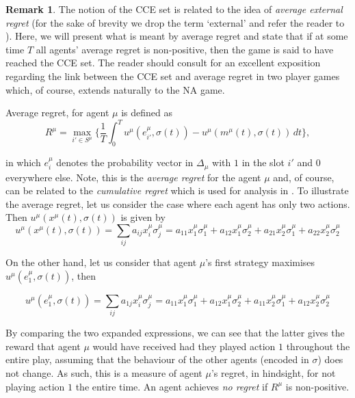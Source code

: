 \documentclass{article}
\theoremstyle{definition}
\newtheorem*{remark}{Remark}
\newcommand{\pure}[2]{e^{#1}_{#2}}
\begin{document}
  \begin{remark} \label{rem::regretvsCCE}
    The notion of the CCE set is related to the idea of \emph{average external regret} (for the
    sake of brevity we drop the term `external' and refer the reader to \cite{Nisan2007}). Here, we
    will present what is meant by average regret and state that if at some time $T$ all agents'
    average regret is non-positive, then the game is said to have reached the CCE set. The
    reader should consult \cite{Ostrovski2014} for an excellent exposition regarding the
    link between the CCE set and average regret in two player games which, of course, extends
    naturally to the NA game.
    
    Average regret, for agent $\mu$ is defined as
%
    \begin{equation}
      R^{\mu} = \max_{i' \in S^\mu} \Big\{ \frac{1}{T} \int_{0}^{T} u^{\mu}(\pure{\mu}{i'}, \sigma(t)) - u^{\mu}(m^\mu(t), \sigma(t)) \, dt \Big\},
    \end{equation}
  
    in which $\pure{\mu}{i}$ denotes the probability vector in $\Delta_\mu$ with $1$ in the slot
    $i'$ and $0$ everywhere else. Note, this is the \emph{average regret} for the agent $\mu$
    and, of course, can be related to the \emph{cumulative regret} which is used for analysis
    in \cite{Leonardos2020, Cesa-Bianchi2021}.  To illustrate the average regret, let us
    consider the case where each agent has only two actions. Then $u^{\mu}(x^\mu(t), \sigma(t))$
    is given by
%    
    \begin{equation}
      u^{\mu}(x^\mu(t), \sigma(t)) = \sum_{ij} a_{ij} x_i^\mu \sigma_j^\mu = a_{11} x_1^\mu \sigma_1^\mu + a_{12} x_1^\mu \sigma_2^\mu + a_{21} x_2^\mu \sigma_1^\mu + a_{22} x_2^\mu \sigma_2^\mu
    \end{equation}
  
    On the other hand, let us consider that agent $\mu$'s first strategy maximises $u^{\mu}(\pure{\mu}{1}, \sigma(t))$, then
  
    \begin{equation}
      u^{\mu}(\pure{\mu}{1}, \sigma(t)) = \sum_{ij} a_{1j} x_i^\mu \sigma_j^\mu = a_{11} x_1^\mu \sigma_1^\mu + a_{12} x_1^\mu \sigma_2^\mu + a_{11} x_2^\mu \sigma_1^\mu + a_{12} x_2^\mu \sigma_2^\mu 
    \end{equation}
  
    By comparing the two expanded expressions, we can see that the latter gives the reward that agent $\mu$ would have received had they played action $1$ throughout the entire play, assuming that the behaviour of the other agents (encoded in $\sigma$) does not change. As such, this is a measure of agent $\mu$'s regret, in hindsight, for not playing action $1$ the entire time. An agent achieves \emph{no regret} if $R^\mu$ is non-positive.
  \end{remark}
\end{document}
